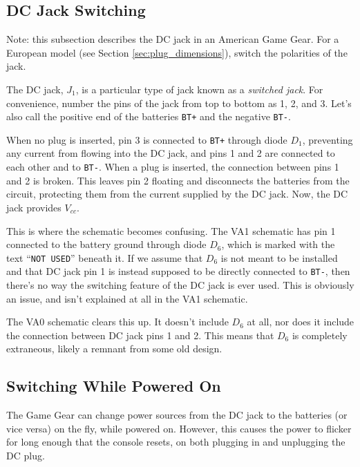 \documentclass{article}
\newcommand{\Vcc}{$V_{cc}$}
\newcommand{\chippin}{\texttt}
\newcommand{\model}{\textsf}
\begin{document}
\subsection{DC Jack Switching}
\label{sec:jack_switching}
Note: this subsection describes the DC jack in an American Game
Gear. For a European model (see Section \ref{sec:plug_dimensions}),
switch the polarities of the jack.

The DC jack, $J_1$, is a particular type of jack known as a
\textit{switched jack}. For convenience, number the pins of the jack
from top to bottom as 1, 2, and 3. Let's also call the positive end of
the batteries \chippin{BT+} and the negative \chippin{BT-}.

When no plug is inserted, pin 3 is connected to \chippin{BT+} through
diode $D_1$, preventing any current from flowing into the DC jack, and
pins 1 and 2 are connected to each other and to \chippin{BT-}. When a
plug is inserted, the connection between pins 1 and 2 is broken. This
leaves pin 2 floating and disconnects the batteries from the circuit,
protecting them from the current supplied by the DC jack. Now, the DC
jack provides \Vcc{}.

This is where the schematic becomes confusing. The \model{VA1}
schematic has pin 1 connected to the battery ground through diode
$D_6$, which is marked with the text ``\texttt{NOT USED}'' beneath
it. If we assume that $D_6$ is not meant to be installed and that DC
jack pin 1 is instead supposed to be directly connected to
\chippin{BT-}, then there's no way the switching feature of the DC
jack is ever used. This is obviously an issue, and isn't explained at
all in the \model{VA1} schematic.

The \model{VA0} schematic clears this up. It doesn't include $D_6$ at
all, nor does it include the connection between DC jack pins 1 and
2. This means that $D_6$ is completely extraneous, likely a remnant
from some old design.

\subsection{Switching While Powered On}
The Game Gear can change power sources from the DC jack to the
batteries (or vice versa) on the fly, while powered on. However, this
causes the power to flicker for long enough that the console resets,
on both plugging in and unplugging the DC plug.
\end{document}
